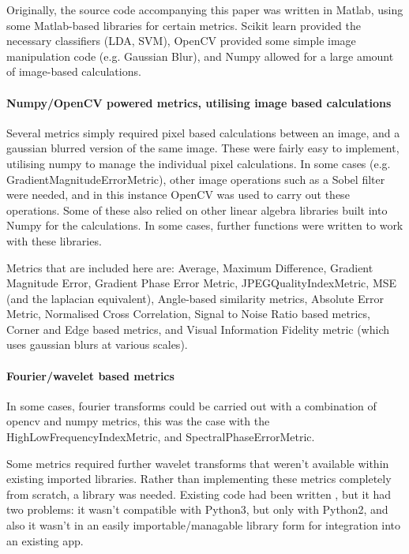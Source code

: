\documentclass[10pt,a4paper]{article}
\begin{document}
        Originally, the source code accompanying this paper was written in Matlab, using some Matlab-based libraries for certain metrics. Scikit learn provided 
        the necessary classifiers (LDA, SVM), OpenCV provided some simple image manipulation code (e.g. Gaussian Blur), and Numpy allowed for a large amount of
        image-based calculations.

        \paragraph{Numpy/OpenCV powered metrics, utilising image based calculations}
        Several metrics simply required pixel based calculations between an image, and a gaussian blurred version of the same image. These were fairly easy to implement,
        utilising numpy to manage the individual pixel calculations. In some cases (e.g. GradientMagnitudeErrorMetric), other image operations such as a Sobel filter were needed, and in this
        instance OpenCV was used to carry out these operations. Some of these also relied on other linear algebra libraries built into Numpy for the calculations.
        In some cases, further functions were written to work with these libraries.

        Metrics that are included here are: Average, Maximum Difference, Gradient Magnitude Error, Gradient Phase Error Metric, JPEGQualityIndexMetric, MSE (and the laplacian equivalent), Angle-based similarity metrics,
        Absolute Error Metric, Normalised Cross Correlation, Signal to Noise Ratio based metrics, Corner and Edge based metrics, and Visual Information Fidelity metric (which uses gaussian blurs at various scales).

        \paragraph{Fourier/wavelet based metrics}
        In some cases, fourier transforms could be carried out with a combination of opencv and numpy metrics, this was the case with the HighLowFrequencyIndexMetric,
        and SpectralPhaseErrorMetric.

        Some metrics required further wavelet transforms that weren't available within existing imported libraries. Rather than implementing these metrics completely
        from scratch, a library was needed. Existing code had been written \cite{VideoQualityOriginal}, but it had two problems: it wasn't compatible with Python3, but only
        with Python2, and also it wasn't in an easily importable/managable library form for integration into an existing app.
\end{document}
